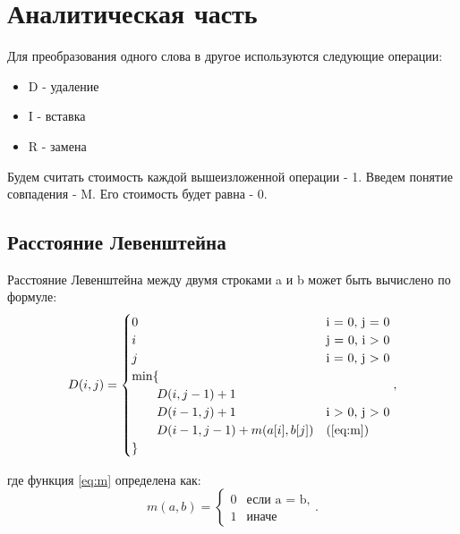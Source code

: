 \chapter{Аналитическая часть}

Для преобразования одного слова в другое используются следующие операции:

\begin{itemize}
	\item D - удаление
	\item I - вставка
	\item R - замена
\end{itemize}

Будем считать стоимость каждой вышеизложенной операции - 1.  
Введем понятие совпадения - M. Его стоимость будет равна - 0.



\section{Расстояние Левенштейна}

Расстояние Левенштейна между двумя строками a и b может быть вычислено по формуле:
\begin{equation}
	\label{eq:D}
	D(i, j) = \begin{cases}
		0 &\text{i = 0, j = 0}\\
		i &\text{j = 0, i > 0}\\
		j &\text{i = 0, j > 0}\\
		\min \lbrace \\
			\qquad D(i, j-1) + 1\\
			\qquad D(i-1, j) + 1 &\text{i > 0, j > 0}\\
			\qquad D(i-1, j-1) + m(a[i], b[j]) &\text(\ref{eq:m})\\
		\rbrace
	\end{cases},
\end{equation}

где функция \ref{eq:m} определена как:
\begin{equation}
	\label{eq:m}
	m(a, b) = \begin{cases}
		0 &\text{если a = b,}\\
		1 &\text{иначе}
	\end{cases}.
\end{equation}



